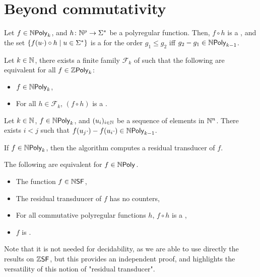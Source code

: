 \section{Beyond commutativity}

\begin{lemma}
    Let $f \in \NPoly[k]$,
    and $h \colon \mathbb{N}^p \to \Sigma^*$ be a polyregular function.
    Then,
    $f \circ h$ is a  ,
    and
    the set $\mathopen{\{}  f(u \cdot) \circ h  \mid u \in \Sigma^*  \mathclose{\}}$
    is a 
    for the order
    $g_1 \leq g_2$ iff 
    $g_2 - g_1 \in \NPoly[k-1]$.
\end{lemma}

\begin{claim}
    Let $k \in \mathbb{N}$,
    there exists a finite family $\mathcal{F}_k$
    of  
    such that the following are equivalent
    for all $f \in \ZPoly[k]$:
    \begin{itemize}
        \item $f \in \NPoly[k]$,
        \item For all $h \in \mathcal{F}_k$,
            $(f \circ h)$ is a 
            .
    \end{itemize}
\end{claim}

\begin{lemma}
    Let $k \in \mathbb{N}$,
    $f \in \NPoly[k]$,
    and $(u_i)_{i \in \mathbb{N}}$ be a sequence of
    elements in $\mathbb{N}^n$. There exists $i < j$
    such that
    $f(u_j \cdot) - f(u_i \cdot) \in \NPoly[k-1]$.
\end{lemma}


\begin{lemma}
    If $f \in \NPoly[k]$, then the algorithm computes
    a residual transducer of $f$.
\end{lemma}


\begin{theorem}
    The following are equivalent for $f \in \NPoly$.
    \begin{itemize}
        \item The function $f \in \NSF$,
        \item The residual transduucer of $f$ has no counters,
        \item For all commutative polyregular functions $h$,
            $f \circ h$ is a 
            ,
        \item $f$ is .
    \end{itemize}
\end{theorem}

Note that it is not needed for decidability, as we are able to use directly the
results on $\ZSF$, but this provides an independent proof, and highlights the
versatility of this notion of "residual transducer".


